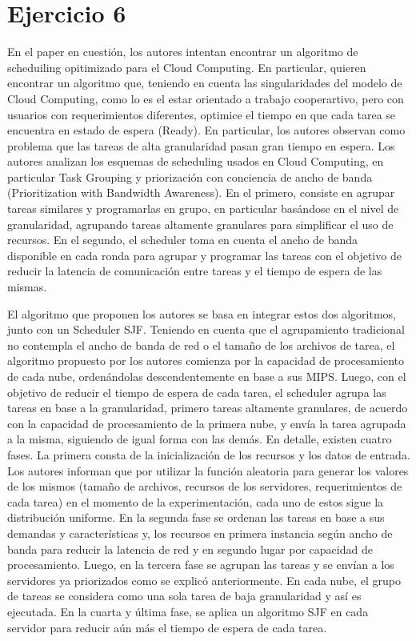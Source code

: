 \section{Ejercicio 6}

En el paper en cuestión, los autores intentan encontrar un algoritmo de scheduiling opitimizado para el Cloud Computing. En particular, quieren encontrar un algoritmo que, teniendo en cuenta las singularidades del modelo de Cloud Computing, como lo es el estar orientado a trabajo cooperartivo, pero con usuarios con requerimientos diferentes, optimice el tiempo en que cada tarea se encuentra en estado de espera (Ready). En particular, los autores observan como problema que las tareas de alta granularidad pasan gran tiempo en espera.
Los autores analizan los esquemas de scheduling usados en Cloud Computing, en particular Task Grouping y priorización con conciencia de ancho de banda (Prioritization with Bandwidth Awareness). En el primero, consiste en agrupar tareas similares y programarlas en grupo, en particular basándose en el nivel de granularidad, agrupando tareas altamente granulares para simplificar el uso de recursos. En el segundo, el scheduler toma en cuenta el ancho de banda disponible en cada ronda para agrupar y programar las tareas con el objetivo de reducir la latencia de comunicación entre tareas y el tiempo de espera de las mismas.

El algoritmo que proponen los autores se basa en integrar estos dos algoritmos, junto con un Scheduler SJF. Teniendo en cuenta que el agrupamiento tradicional no contempla el ancho de banda de red o el tamaño de los archivos de tarea, el algoritmo propuesto por los autores comienza por la capacidad de procesamiento de cada nube, ordenándolas descendentemente en base a sus MIPS. Luego, con el objetivo de reducir el tiempo de espera de cada tarea, el scheduler agrupa las tareas en base a la granularidad, primero tareas altamente granulares, de acuerdo con la capacidad de procesamiento de la primera nube, y envía la tarea agrupada a la misma, siguiendo de igual forma con las demás.	
En detalle, existen cuatro fases. La primera consta de la inicialización de los recursos y los datos de entrada. Los autores informan que por utilizar la función aleatoria para generar los valores de los mismos (tamaño de archivos, recursos de los servidores, requerimientos de cada tarea) en el momento de la experimentación, cada uno de estos sigue la distribución uniforme. En la segunda fase se ordenan las tareas en base a sus demandas y características y, los recursos en primera instancia según ancho de banda para reducir la latencia de red y en segundo lugar por capacidad de procesamiento. Luego, en la tercera fase se agrupan las tareas y se envían a los servidores ya priorizados como se explicó anteriormente. En cada nube, el grupo de tareas se considera como una sola tarea de baja granularidad y así es ejecutada. En la cuarta y última fase, se aplica un algoritmo SJF en cada servidor para reducir aún más el tiempo de espera de cada tarea.

